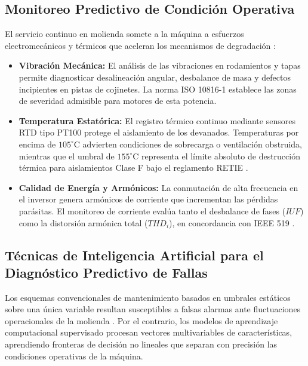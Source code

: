 \documentclass[conference]{IEEEtran}
\begin{document}
\subsection{Monitoreo Predictivo de Condición Operativa}
El servicio continuo en molienda somete a la máquina a esfuerzos electromecánicos y térmicos que aceleran los mecanismos de degradación \cite{toliyat2012}:
\begin{itemize}
    \item \textbf{Vibración Mecánica:} El análisis de las vibraciones en rodamientos y tapas permite diagnosticar desalineación angular, desbalance de masa y defectos incipientes en pistas de cojinetes. La norma ISO 10816-1 \cite{iso10816} establece las zonas de severidad admisible para motores de esta potencia.
    \item \textbf{Temperatura Estatórica:} El registro térmico continuo mediante sensores RTD tipo PT100 protege el aislamiento de los devanados. Temperaturas por encima de $105^\circ$C advierten condiciones de sobrecarga o ventilación obstruida, mientras que el umbral de $155^\circ$C representa el límite absoluto de destrucción térmica para aislamientos Clase F bajo el reglamento RETIE \cite{retie2013, nandi2005}.
    \item \textbf{Calidad de Energía y Armónicos:} La conmutación de alta frecuencia en el inversor genera armónicos de corriente que incrementan las pérdidas parásitas. El monitoreo de corriente evalúa tanto el desbalance de fases ($IUF$) como la distorsión armónica total ($THD_i$), en concordancia con IEEE 519 \cite{ieee519}.
\end{itemize}

\subsection{Técnicas de Inteligencia Artificial para el Diagnóstico Predictivo de Fallas}
\label{sec:teoria_ia}
Los esquemas convencionales de mantenimiento basados en umbrales estáticos sobre una única variable resultan susceptibles a falsas alarmas ante fluctuaciones operacionales de la molienda \cite{soualhi2022, gao2015}. Por el contrario, los modelos de aprendizaje computacional supervisado procesan vectores multivariables de características, aprendiendo fronteras de decisión no lineales que separan con precisión las condiciones operativas de la máquina.
\end{document}
